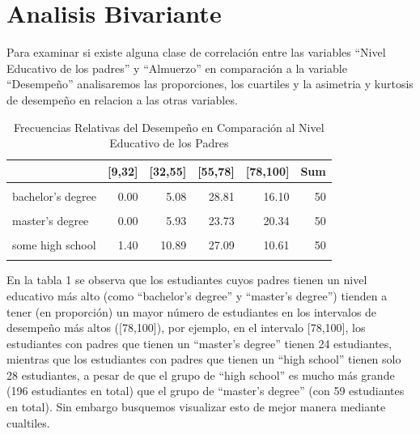\documentclass[
]{article}
\begin{document}
\section{Analisis Bivariante}\label{analisis-bivariante}

Para examinar si existe alguna clase de correlación entre las variables
``Nivel Educativo de los padres'' y ``Almuerzo'' en comparación a la
variable ``Desempeño'' analisaremos las proporciones, los cuartiles y la
asimetria y kurtosis de desempeño en relacion a las otras variables.

\begin{table}[!h]
\centering
\caption{\label{tab:tabla de frecuencias relativas porcentuales 1 }Frecuencias Relativas del Desempeño en Comparación al Nivel Educativo de los Padres}
\centering
\begin{tabular}[t]{lrrrrr}
\toprule
  & {}[9,32] & {}[32,55] & {}[55,78] & {}[78,100] & Sum\\
\midrule
\cellcolor{gray!10}{associate's degree} & \cellcolor{gray!10}{0.23} & \cellcolor{gray!10}{8.33} & \cellcolor{gray!10}{27.25} & \cellcolor{gray!10}{14.19} & \cellcolor{gray!10}{50}\\
bachelor's degree & 0.00 & 5.08 & 28.81 & 16.10 & 50\\
\cellcolor{gray!10}{high school} & \cellcolor{gray!10}{1.02} & \cellcolor{gray!10}{13.52} & \cellcolor{gray!10}{28.32} & \cellcolor{gray!10}{7.14} & \cellcolor{gray!10}{50}\\
master's degree & 0.00 & 5.93 & 23.73 & 20.34 & 50\\
\cellcolor{gray!10}{some college} & \cellcolor{gray!10}{0.88} & \cellcolor{gray!10}{6.42} & \cellcolor{gray!10}{29.87} & \cellcolor{gray!10}{12.83} & \cellcolor{gray!10}{50}\\
\addlinespace
some high school & 1.40 & 10.89 & 27.09 & 10.61 & 50\\
\cellcolor{gray!10}{Sum} & \cellcolor{gray!10}{0.70} & \cellcolor{gray!10}{8.85} & \cellcolor{gray!10}{28.00} & \cellcolor{gray!10}{12.45} & \cellcolor{gray!10}{50}\\
\bottomrule
\end{tabular}
\end{table}

En la tabla 1 se observa que los estudiantes cuyos padres tienen un
nivel educativo más alto (como ``bachelor's degree'' y ``master's
degree'') tienden a tener (en proporción) un mayor número de estudiantes
en los intervalos de desempeño más altos ({[}78,100{]}), por ejemplo, en
el intervalo {[}78,100{]}, los estudiantes con padres que tienen un
``master's degree'' tienen 24 estudiantes, mientras que los estudiantes
con padres que tienen un ``high school'' tienen solo 28 estudiantes, a
pesar de que el grupo de ``high school'' es mucho más grande (196
estudiantes en total) que el grupo de ``master's degree'' (con 59
estudiantes en total). Sin embargo busquemos visualizar esto de mejor
manera mediante cualtiles.
\end{document}
